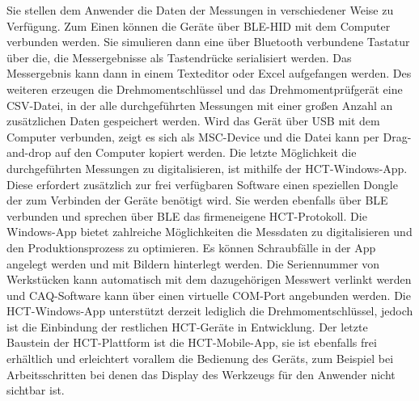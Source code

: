 Sie stellen dem Anwender die Daten der Messungen in verschiedener Weise zu Verfügung. Zum Einen können die Geräte über BLE-HID mit dem Computer verbunden werden. Sie simulieren dann eine über Bluetooth verbundene Tastatur über die, die Messergebnisse als Tastendrücke serialisiert werden. Das Messergebnis kann dann in einem Texteditor oder Excel aufgefangen werden. Des weiteren erzeugen die Drehmomentschlüssel und das Drehmomentprüfgerät eine CSV-Datei, in der alle durchgeführten Messungen mit einer großen Anzahl an zusätzlichen Daten gespeichert werden. Wird das Gerät über USB mit dem Computer verbunden, zeigt es sich als MSC-Device und die Datei kann per Drag-and-drop auf den Computer kopiert werden. Die letzte Möglichkeit die durchgeführten Messungen zu digitalisieren, ist mithilfe der HCT-Windows-App. Diese erfordert zusätzlich zur frei verfügbaren Software einen speziellen Dongle der zum Verbinden der Geräte benötigt wird. Sie werden ebenfalls über BLE verbunden und sprechen über BLE das firmeneigene HCT-Protokoll. Die Windows-App bietet zahlreiche Möglichkeiten die Messdaten zu digitalisieren und den Produktionsprozess zu optimieren. Es können Schraubfälle in der App angelegt werden und mit Bildern hinterlegt werden. Die Seriennummer von Werkstücken kann automatisch mit dem dazugehörigen Messwert verlinkt werden und CAQ-Software kann über einen virtuelle COM-Port angebunden werden. Die HCT-Windows-App unterstützt derzeit lediglich die Drehmomentschlüssel, jedoch ist die Einbindung der restlichen HCT-Geräte in Entwicklung. Der letzte Baustein der HCT-Plattform ist die HCT-Mobile-App, sie ist ebenfalls frei erhältlich und erleichtert vorallem die Bedienung des Geräts, zum Beispiel bei Arbeitsschritten bei denen das Display des Werkzeugs für den Anwender nicht sichtbar ist.


